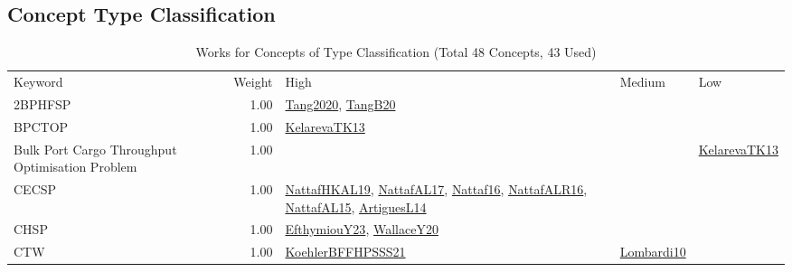 \subsection{Concept Type Classification}
\label{sec:Classification}
\label{Classification}
{\scriptsize
\begin{longtable}{p{3cm}r>{\raggedright\arraybackslash}p{6cm}>{\raggedright\arraybackslash}p{6cm}>{\raggedright\arraybackslash}p{8cm}}
\rowcolor{white}\caption{Works for Concepts of Type Classification (Total 48 Concepts, 43 Used)}\\ \toprule
\rowcolor{white}Keyword & Weight & High & Medium & Low\\ \midrule\endhead
\bottomrule
\endfoot
\index{2BPHFSP}\index{Classification!2BPHFSP}2BPHFSP &  1.00 & \hyperref[detail:Tang2020]{Tang2020}, \hyperref[detail:TangB20]{TangB20} &  & \\
\index{BPCTOP}\index{Classification!BPCTOP}BPCTOP &  1.00 & \hyperref[detail:KelarevaTK13]{KelarevaTK13} &  & \\
\index{Bulk Port Cargo Throughput Optimisation Problem}\index{Classification!Bulk Port Cargo Throughput Optimisation Problem}Bulk Port Cargo Throughput Optimisation Problem &  1.00 &  &  & \hyperref[detail:KelarevaTK13]{KelarevaTK13}\\
\index{CECSP}\index{Classification!CECSP}CECSP &  1.00 & \hyperref[detail:NattafHKAL19]{NattafHKAL19}, \hyperref[detail:NattafAL17]{NattafAL17}, \hyperref[detail:Nattaf16]{Nattaf16}, \hyperref[detail:NattafALR16]{NattafALR16}, \hyperref[detail:NattafAL15]{NattafAL15}, \hyperref[detail:ArtiguesL14]{ArtiguesL14} &  & \\
\index{CHSP}\index{Classification!CHSP}CHSP &  1.00 & \hyperref[detail:EfthymiouY23]{EfthymiouY23}, \hyperref[detail:WallaceY20]{WallaceY20} &  & \\
\index{CTW}\index{Classification!CTW}CTW &  1.00 & \hyperref[detail:KoehlerBFFHPSSS21]{KoehlerBFFHPSSS21} & \hyperref[detail:Lombardi10]{Lombardi10} & \\

\end{longtable}}
